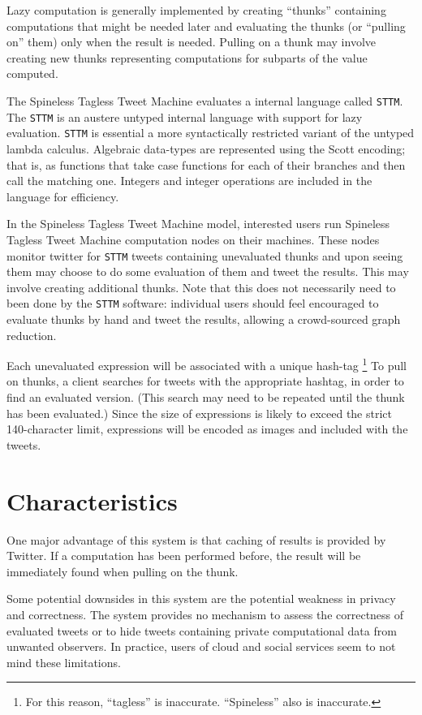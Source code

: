 \documentclass{sigplanconf}
\renewcommand{\t}{\texttt}
\begin{document}
Lazy computation is generally implemented by creating ``thunks''
containing computations that might be needed later and evaluating the
thunks (or ``pulling on'' them) only when the result is
needed. Pulling on a thunk may involve creating new thunks
representing computations for subparts of the value computed.

The Spineless Tagless Tweet Machine evaluates a internal language
called \t{STTM}. The \t{STTM} is an austere untyped internal language
with support for lazy evaluation. \t{STTM} is essential a more
syntactically restricted variant of the untyped lambda calculus.
Algebraic data-types are represented
using the Scott encoding; that is, as functions that take case
functions for each of their branches and then call the matching one.
Integers and integer operations are included in the language for
efficiency.

In the Spineless Tagless Tweet Machine model, interested users run
Spineless Tagless Tweet Machine computation nodes on their
machines. These nodes monitor twitter for \t{STTM} tweets containing
unevaluated thunks and upon seeing them may choose to do some
evaluation of them and tweet the results. This may involve creating
additional thunks. Note that this does not necessarily need to been
done by the \t{STTM} software: individual users should feel encouraged
to evaluate thunks by hand and tweet the results, allowing a
crowd-sourced graph reduction.

Each unevaluated expression will be associated with a unique
hash-tag \footnote{For this reason, ``tagless'' is
  inaccurate. ``Spineless'' also is inaccurate.}  To pull on thunks, a
client searches for tweets with the appropriate hashtag, in order to
find an evaluated version. (This search may need to be repeated until
the thunk has been evaluated.) Since the size of expressions is likely
to exceed the strict 140-character limit, expressions will be encoded
as images and included with the tweets.

\section{Characteristics}
One major advantage of this system is that caching of results is
provided by Twitter. If a computation has been performed before, the
result will be immediately found when pulling on the thunk.

Some potential downsides in this system are the potential weakness in
privacy and correctness. The system provides no mechanism to assess
the correctness of evaluated tweets or to hide tweets containing
private computational data from unwanted observers. In practice, users
of cloud and social services seem to not mind these limitations.
\end{document}
